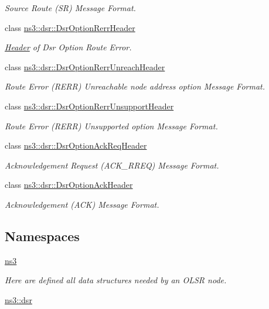 \begin{DoxyCompactItemize}
\begin{DoxyCompactList}\small\item\em Source Route (SR) Message Format. \end{DoxyCompactList}\item 
class \hyperlink{classns3_1_1dsr_1_1DsrOptionRerrHeader}{ns3\+::dsr\+::\+Dsr\+Option\+Rerr\+Header}
\begin{DoxyCompactList}\small\item\em \hyperlink{classns3_1_1Header}{Header} of Dsr Option Route Error. \end{DoxyCompactList}\item 
class \hyperlink{classns3_1_1dsr_1_1DsrOptionRerrUnreachHeader}{ns3\+::dsr\+::\+Dsr\+Option\+Rerr\+Unreach\+Header}
\begin{DoxyCompactList}\small\item\em Route Error (R\+E\+RR) Unreachable node address option Message Format. \end{DoxyCompactList}\item 
class \hyperlink{classns3_1_1dsr_1_1DsrOptionRerrUnsupportHeader}{ns3\+::dsr\+::\+Dsr\+Option\+Rerr\+Unsupport\+Header}
\begin{DoxyCompactList}\small\item\em Route Error (R\+E\+RR) Unsupported option Message Format. \end{DoxyCompactList}\item 
class \hyperlink{classns3_1_1dsr_1_1DsrOptionAckReqHeader}{ns3\+::dsr\+::\+Dsr\+Option\+Ack\+Req\+Header}
\begin{DoxyCompactList}\small\item\em Acknowledgement Request (A\+C\+K\+\_\+\+R\+R\+EQ) Message Format. \end{DoxyCompactList}\item 
class \hyperlink{classns3_1_1dsr_1_1DsrOptionAckHeader}{ns3\+::dsr\+::\+Dsr\+Option\+Ack\+Header}
\begin{DoxyCompactList}\small\item\em Acknowledgement (A\+CK) Message Format. \end{DoxyCompactList}\end{DoxyCompactItemize}
\subsection*{Namespaces}
\begin{DoxyCompactItemize}
\item 
 \hyperlink{namespacens3}{ns3}
\begin{DoxyCompactList}\small\item\em Here are defined all data structures needed by an O\+L\+SR node. \end{DoxyCompactList}\item 
 \hyperlink{namespacens3_1_1dsr}{ns3\+::dsr}
\end{DoxyCompactItemize}
